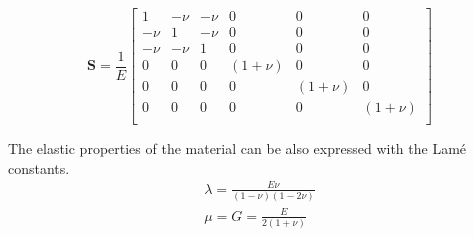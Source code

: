 \documentclass[a4paper, 11pt,article,oneside]{memoir}%
\begin{document}
\begin{eqbox}
\begin{equation*}
\boldsymbol{S}=\frac{1}{E}
\begin{bmatrix}
1&-\nu&-\nu&0&0&0\\
-\nu&1&-\nu&0&0&0\\
-\nu&-\nu&1&0&0&0\\
0&0&0&(1+\nu)&0&0\\
0&0&0&0&(1+\nu)&0\\
0&0&0&0&0&(1+\nu)\\
\end{bmatrix}
\end{equation*}
\end{eqbox}
The elastic properties of the material can be also expressed with the Lamé constants.
\begin{gather*}
\lambda=\frac{E\nu}{(1-\nu)(1-2\nu)}\\
\mu=G=\frac{E}{2(1+\nu)}
\end{gather*}
\end{document}
